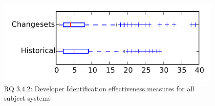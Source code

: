 
\begin{figure}
\centering
\includegraphics[height=0.4\textheight]{figures/dit/rq2_tiny}
\caption{RQ 3.4.2: Developer Identification effectiveness measures for all subject systems}
\label{fig:dit:rq2:tiny}
\end{figure}

